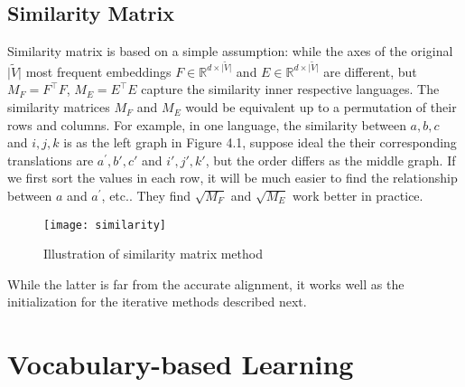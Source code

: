 \subsection{Similarity Matrix}
Similarity matrix is based on a simple assumption: while the axes of the original ${\lvert \tilde{V} \rvert}$ most frequent embeddings ${F \in \mathbb{R}^{d \times {\lvert \tilde{V} \rvert} }}$ and ${E \in \mathbb{R}^{d \times {\lvert \tilde{V} \rvert} }}$  are different, but $M_F=F^{\top}F$, $M_E = E^{\top}E$ capture the similarity inner respective languages. The similarity matrices $M_F$ and $M_E$ would be equivalent up to a permutation of their rows and columns. For example, in one language, the similarity between $a,b,c$ and $i,j,k$ is as the left graph in Figure 4.1, suppose ideal the their corresponding translations are $a^{\prime},b{\prime},c{\prime}$ and $i{\prime},j{\prime},k{\prime}$, but the order differs as the middle graph. If we first sort the values in each row, it will be much easier to find the relationship between $a$ and $a^{\prime}$, etc.. They find $\sqrt{M_F}$ and $\sqrt{M_E}$ 
work better in practice.
\begin{figure}[H]
	\texttt{[image: similarity]}
	\centering
	\caption{Illustration of similarity matrix method}
\end{figure}

While the latter is far from the accurate alignment, it works well as the initialization for the iterative methods described next.
\section{Vocabulary-based Learning}
